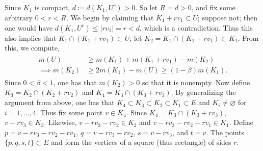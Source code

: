 \documentclass{article}
\begin{document}
		Since $K_1$ is compact, $d \coloneqq d(K_1, U^{c}) > 0$. So let $R = d > 0$, and fix some arbitrary $0 < r < R$. We begin by claiming that $K_1 + rv_1 \subset U$; suppose not; then one would have $d(K_1, U^c) \leq |rv_1| = r < d$, which is a contradiction. Thus this also implies that $K_1 \cap (K_1 + rv_1) \subset U$; let $K_2 = K_1 \cap (K_1 + rv_1) \subset K_1$. From this, we compute, 
		\begin{align*}
			\begin{split}
				m(U) &\geq  m(K_1) + m(K_1 + rv_1) - m(K_2) \\
				\implies 
				m(K_2) &\geq 2m(K_1) - m(U) \geq (1 - \beta)m(K_1). 
			\end{split}
		\end{align*}
		Since $0 < \beta < 1$, one has that $m(K_2) > 0$ so that it is nonempty. Now define $K_3 = K_2 \cap (K_2 + rv_2)$ and $K_4 = K_3 \cap (K_3 + rv_3)$. By generalizing the argument from above, one has that $K_4 \subset K_3 \subset K_2 \subset K_1 \subset E$ and $K_i \neq \varnothing$ for $i = 1, \ldots, 4$. Thus fix some point $v \in K_4$. Since $K_4 = K_3 \cap (K_3 + rv_3)$, $v - rv_3 \in K_3$. Likewise, $v - rv_3 - rv_2 \in K_2$ and $v - rv_3 - rv_2 - rv_1 \in K_1$. Define $p = v - rv_3 - rv_2 - rv_1$, $q = v - rv_3 - rv_2$, $s = v - rv_3$, and $t = v$. The points $\{p, q, s, t\} \subset E$ and form the vertices of a square (thus rectangle) of sides $r$. 
		
\end{document}
